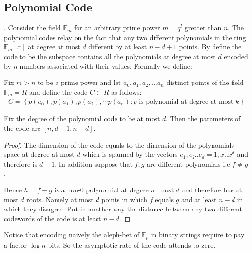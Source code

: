 \documentclass[manuscript,screen,review]{acmart}
\begin{document}
\subsection{Polynomial Code}. Consider the field $\mathbb{F}_{m}$ for an arbitrary prime power $m=q^{l}$ greater than $n$. The polynomial codes relay on the fact that any two different polynomials in the ring $\mathbb{F}_{m}\left[ x \right]$ at degree at most $d$ different by at least $n - d + 1$ points. By define the code to be the subspace contains all the polynomials at degree at most $d$ encoded by $n$ numbers associated with their values. Formally we define:     
\begin{definition}
  Fix $m > n $ to be a prime power and let $a_{0},a_{1},a_{2},\ldots a_{n}$ distinct points of the field $\mathbb{F}_{m} = R$  and define the code $C \subset R $ as follows:  
  \begin{equation*}
    \begin{split}
      C = \left\{p\left(a_{0}\right),p\left(a_{1}\right),p\left(a_{2}\right),\cdots p\left(a_{n}\right) : p \text{ is polynomial at degree at most } k \right\}
    \end{split}
  \end{equation*}
\end{definition}
\begin{lemma}
  Fix the degree of the polynomial code to be at most $d$. Then the parameters of the code are $[n,d + 1, n - d]$.  
  \label{polycode}
\end{lemma}
\begin{proof}
  The dimension of the code equals to the dimension of the polynomials space at degree at most $d$ which is spanned by the vectors $e_{1}, e_{2} .. e_{d} = 1, x .. x^{d}$ and therefore is $d+1$. In addition suppose that $f,g$ are different polynomials i.e $f\neq g$.

  Hence $h = f-g$ is a non-$0$ polynomial at degree at most $d$ and therefore has at most $d$ roots. Namely at most $d$ points in which $f$ equals $g$ and at least $n-d$ in which they disagree. Put in another way the distance between any two different codewords of the code is at least $n-d$.  
\end{proof}
Notice that encoding naively the aleph-bet of $\mathbb{F}_{p}$ in binary strings require to pay a factor $\log n$ bits, So the asymptotic rate of the code attends to zero.     
\end{document}
